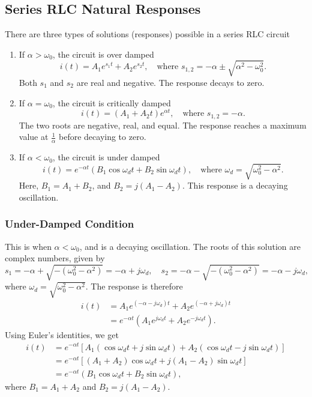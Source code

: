 \documentclass{article}
\begin{document}
\subsection{Series RLC Natural Responses}
There are three types of solutions (responses) possible in a series RLC circuit
\begin{enumerate}
    \item If $\alpha >\omega _0$, the circuit is over damped 
    \[
        i(t)=A_1e^{s_1t}+A_2e^{s_2t},\quad \text{where } s_{1,2}=-\alpha \pm \sqrt{\alpha^2-\omega _0^2}.
    \]
    Both $s_1$ and $s_2$ are real and negative. The response decays to zero.
\item If $\alpha =\omega _0$, the circuit is critically damped 
\[
    i(t)=\left( A_1+A_2t \right)e^{\alpha t},\quad \text{where } s_{1,2}=-\alpha .
\]
The two roots are negative, real, and equal. The response reaches a maximum value at $\frac{1}{\alpha }$ before decaying to zero.
\item If $\alpha <\omega _0$, the circuit is under damped 
\[
    i(t)=e^{-\alpha t}\left( B_1\cos\omega _dt+B_2\sin\omega _dt \right),\quad \text{where } \omega _d=\sqrt{\omega _0^2-\alpha ^2}.
\]
Here, $B_1=A_1+B_2$, and $B_2=j(A_1-A_2)$. This response is a decaying oscillation.
\end{enumerate}

\subsubsection{Under-Damped Condition}
This is when $\alpha <\omega _0$, and is a decaying oscillation. The roots of this solution are complex numbers, given by 
\[
    s_1=-\alpha +\sqrt{-\left( \omega^2_0-\alpha^2 \right)}=-\alpha +j\omega _d,\quad s_2=-\alpha -\sqrt{-\left( \omega _0^2-\alpha^2 \right)}=-\alpha -j\omega _d,
\]
where $\omega _d=\sqrt{\omega _0^2-\alpha^2}$. The response is therefore
\begin{align*}
    i(t) &= A_1e^{(-\alpha -j\omega _d)t}+A_2e^{\left( -\alpha +j\omega _d \right)t}\\
         &= e^{-\alpha t}\left( A_1e^{j\omega _dt}+A_2e^{-j\omega _dt} \right).
\end{align*}
Using Euler's identities, we get
\begin{align*}
    i(t) &= e^{-\alpha t}\left[ A_1 \left( \cos\omega _dt+j\sin\omega _dt \right) +A_2 \left( \cos\omega _dt-j\sin\omega _dt \right)\right] \\
         &= e^{-\alpha t}\left[ \left( A_1+A_2 \right)\cos\omega _dt+j(A_1-A_2)\sin\omega _dt \right] \\
         &=e^{-\alpha t}(B_1\cos\omega _dt+B_2\sin\omega _dt),
\end{align*}
where $B_1=A_1+A_2$ and $B_2=j(A_1-A_2)$.
\end{document}
